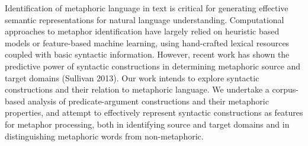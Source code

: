 Identification of metaphoric language in text is critical for generating effective semantic representations for natural language understanding. Computational approaches to metaphor identification have largely relied on heuristic based models or feature-based machine learning, using hand-crafted lexical resources coupled with basic syntactic information. However, recent work has shown the predictive power of syntactic constructions in determining metaphoric source and target domains (Sullivan 2013). Our work intends to explore syntactic constructions and their relation to metaphoric language. We undertake a corpus-based analysis of predicate-argument constructions and their metaphoric properties, and attempt to effectively represent syntactic constructions as features for metaphor processing, both in identifying source and target domains and in distinguishing metaphoric words from non-metaphoric.
